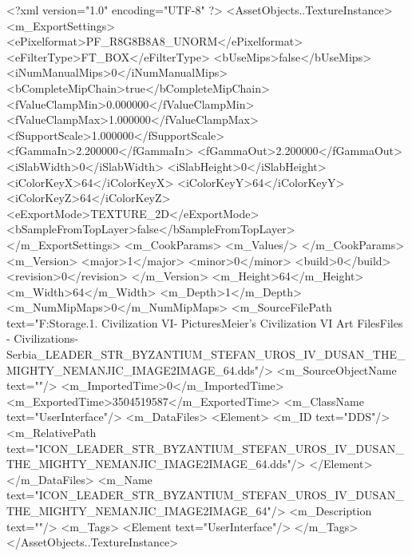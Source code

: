 <?xml version="1.0" encoding="UTF-8" ?>
<AssetObjects..TextureInstance>
	<m_ExportSettings>
		<ePixelformat>PF_R8G8B8A8_UNORM</ePixelformat>
		<eFilterType>FT_BOX</eFilterType>
		<bUseMips>false</bUseMips>
		<iNumManualMips>0</iNumManualMips>
		<bCompleteMipChain>true</bCompleteMipChain>
		<fValueClampMin>0.000000</fValueClampMin>
		<fValueClampMax>1.000000</fValueClampMax>
		<fSupportScale>1.000000</fSupportScale>
		<fGammaIn>2.200000</fGammaIn>
		<fGammaOut>2.200000</fGammaOut>
		<iSlabWidth>0</iSlabWidth>
		<iSlabHeight>0</iSlabHeight>
		<iColorKeyX>64</iColorKeyX>
		<iColorKeyY>64</iColorKeyY>
		<iColorKeyZ>64</iColorKeyZ>
		<eExportMode>TEXTURE_2D</eExportMode>
		<bSampleFromTopLayer>false</bSampleFromTopLayer>
	</m_ExportSettings>
	<m_CookParams>
		<m_Values/>
	</m_CookParams>
	<m_Version>
		<major>1</major>
		<minor>0</minor>
		<build>0</build>
		<revision>0</revision>
	</m_Version>
	<m_Height>64</m_Height>
	<m_Width>64</m_Width>
	<m_Depth>1</m_Depth>
	<m_NumMipMaps>0</m_NumMipMaps>
	<m_SourceFilePath text="F:\Mod Storage\2.1. Civilization VI\Mods\Archive - Pictures\Sid Meier's Civilization VI Art Files\Art Files - Civilizations\Civilization - Serbia\ICON_LEADER_STR_BYZANTIUM_STEFAN_UROS_IV_DUSAN_THE_MIGHTY_NEMANJIC_IMAGE2IMAGE_64.dds"/>
	<m_SourceObjectName text=""/>
	<m_ImportedTime>0</m_ImportedTime>
	<m_ExportedTime>3504519587</m_ExportedTime>
	<m_ClassName text="UserInterface"/>
	<m_DataFiles>
		<Element>
			<m_ID text="DDS"/>
			<m_RelativePath text="ICON_LEADER_STR_BYZANTIUM_STEFAN_UROS_IV_DUSAN_THE_MIGHTY_NEMANJIC_IMAGE2IMAGE_64.dds"/>
		</Element>
	</m_DataFiles>
	<m_Name text="ICON_LEADER_STR_BYZANTIUM_STEFAN_UROS_IV_DUSAN_THE_MIGHTY_NEMANJIC_IMAGE2IMAGE_64"/>
	<m_Description text=""/>
	<m_Tags>
		<Element text="UserInterface"/>
	</m_Tags>
</AssetObjects..TextureInstance>

